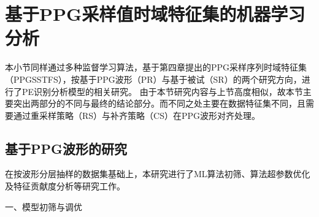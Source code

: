 \section{基于PPG采样值时域特征集的机器学习分析}
本小节同样通过多种监督学习算法，基于第四章提出的PPG采样序列时域特征集（PPGSSTFS），按基于PPG波形（PR）与基于被试（SR）的两个研究方向，进行了PE识别分析模型的相关研究。
由于本节研究内容与上节高度相似，故本节主要突出两部分的不同与最终的结论部分。而不同之处主要在数据特征集不同，且需要通过重采样策略（RS）与补齐策略（CS）在PPG波形对齐处理。

\subsection{基于PPG波形的研究}

在按波形分层抽样的数据集基础上，本研究进行了ML算法初筛、算法超参数优化及特征贡献度分析等研究工作。

一、模型初筛与调优

